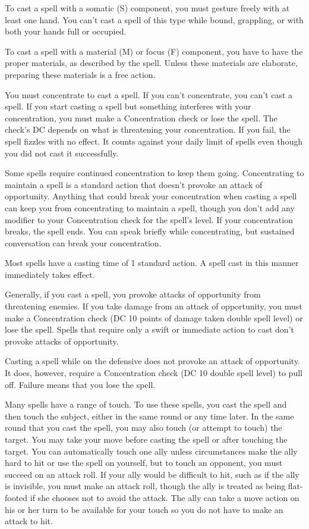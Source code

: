To cast a spell with a somatic (S) component, you must gesture freely with at least one hand. You can't cast a spell of this type while bound, grappling, or with both your hands full or occupied.

To cast a spell with a material (M) or focus (F) component, you have to have the proper materials, as described by the spell. Unless these materials are elaborate, preparing these materials is a free action.

 You must concentrate to cast a spell. If you can't concentrate, you can't cast a spell. If you start casting a spell but something interferes with your concentration, you must make a Concentration check or lose the spell. The check's DC depends on what is threatening your concentration. If you fail, the spell fizzles with no effect. It counts against your daily limit of spells even though you did not cast it successfully.

 Some spells require continued concentration to keep them going. Concentrating to maintain a spell is a standard action that doesn't provoke an attack of opportunity. Anything that could break your concentration when casting a spell can keep you from concentrating to maintain a spell, though you don't add any modifier to your Concentration check for the spell's level. If your concentration breaks, the spell ends. You can speak briefly while concentrating, but sustained conversation can break your concentration.

 Most spells have a casting time of 1 standard action. A spell cast in this manner immediately takes effect.

 Generally, if you cast a spell, you provoke attacks of opportunity from threatening enemies. If you take damage from an attack of opportunity, you must make a Concentration check (DC 10 \add points of damage taken \add double spell level) or lose the spell. Spells that require only a swift or immediate action to cast don't provoke attacks of opportunity.

 Casting a spell while on the defensive does not provoke an attack of opportunity. It does, however, require a Concentration check (DC 10 \add double spell level) to pull off. Failure means that you lose the spell.

 Many spells have a range of touch. To use these spells, you cast the spell and then touch the subject, either in the same round or any time later. In the same round that you cast the spell, you may also touch (or attempt to touch) the target. You may take your move before casting the spell or after touching the target. You can automatically touch one ally unless circumstances make the ally hard to hit or use the spell on yourself, but to touch an opponent, you must succeed on an attack roll. If your ally would be difficult to hit, such as if the ally is invisible, you must make an attack roll, though the ally is treated as being flat-footed if she chooses not to avoid the attack. The ally can take a move action on his or her turn to be available for your touch so you do not have to make an attack to hit.

